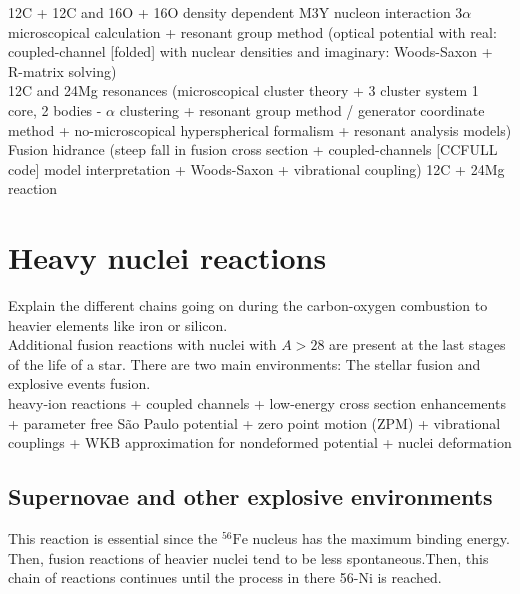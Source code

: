 \documentclass[openany]{book}
\begin{document}
12C + 12C and 16O + 16O density dependent M3Y nucleon interaction $3\alpha$ microscopical calculation + resonant group method (optical potential with real: coupled-channel [folded] with nuclear densities and imaginary: Woods-Saxon + R-matrix solving)  \cite{assuncao_descouvemont_2015} \\

12C and 24Mg resonances (microscopical cluster theory + 3 cluster system 1 core, 2 bodies - $\alpha$ clustering + resonant group method / generator coordinate method + no-microscopical hyperspherical formalism + resonant analysis models) \cite{descouvemont_2021} \\

Fusion hidrance (steep fall in fusion cross section + coupled-channels [CCFULL code] model interpretation + Woods-Saxon + vibrational coupling) 12C + 24Mg reaction \cite{montagnoli_stefanini_jiang_colucci_goasduff_brugnara_mazzocco_siciliano_scarlassara_corradi_et_2020} 


\section{Heavy nuclei reactions } \label{sec:heavyReactions}

Explain the different chains going on during the carbon-oxygen combustion to heavier elements like iron or silicon. \\

Additional fusion reactions with nuclei with $A > 28$ are present at the last stages of the life of a star. There are two main environments: The stellar fusion and explosive events fusion. \\

heavy-ion reactions + coupled channels + low-energy cross section enhancements  + parameter free São Paulo potential + zero point motion (ZPM) + vibrational couplings + WKB approximation for nondeformed potential  + nuclei deformation \cite{nobre_chamon_gasques_carlson_thompson_2007}

\subsection{Supernovae and other explosive environments} \label{sub:explosive}

This reaction is essential since the $\mathrm{{}^{56}Fe}$ nucleus has the maximum binding energy. Then, fusion reactions of heavier nuclei tend to be less spontaneous.Then,  this chain of reactions continues until the process in there 56-Ni is reached.
\end{document}
